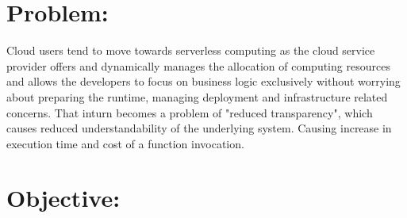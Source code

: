 



\section{Problem:}

Cloud users tend to move towards serverless computing as the cloud service provider offers and dynamically manages the allocation of computing resources and allows the developers to focus on business logic exclusively without worrying about preparing the runtime, managing deployment and infrastructure related concerns.
That inturn becomes a problem of "reduced transparency", which causes reduced understandability of the underlying system. 
Causing increase in execution time and cost of a function invocation.

\section{Objective:}

